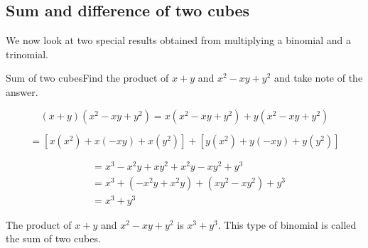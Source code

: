 \subsection*{Sum and difference of two cubes}      
We now look at two special results obtained from multiplying a binomial and a trinomial. 

\begin{wex}{Sum of two cubes}{Find the product of $x+y$ and ${x}^{2}-xy+{y}^{2}$ and take note of the answer.}
{
\begin{equation*}
  (x+y)({x}^{2}-xy+{y}^{2}) = x({x}^{2}-xy+{y}^{2})+y({x}^{2}- xy+{y}^{2})
\end{equation*}

\begin{equation*}
  = \left[x({x}^{2})+x(-xy)+x({y}^{2})\right]+\left[y({x}^{2})+y(-xy)+y({y}^{2})\right]
\end{equation*}

\begin{align*}
  &= {x}^{3}-{x}^{2}y+x{y}^{2}+{x}^{2}y-x{y}^{2}+{y}^{3} \\
  &= {x}^{3}+(-{x}^{2}y+{x}^{2}y)+(x{y}^{2}-x{y}^{2})+{y}^{3} \\
  &= {x}^{3}+{y}^{3}
\end{align*}

The product of $x+y$ and ${x}^{2}-xy+{y}^{2}$ is ${x}^{3}+{y}^{3}$.
This type of binomial is called the sum of two cubes. 
}
\end{wex}




